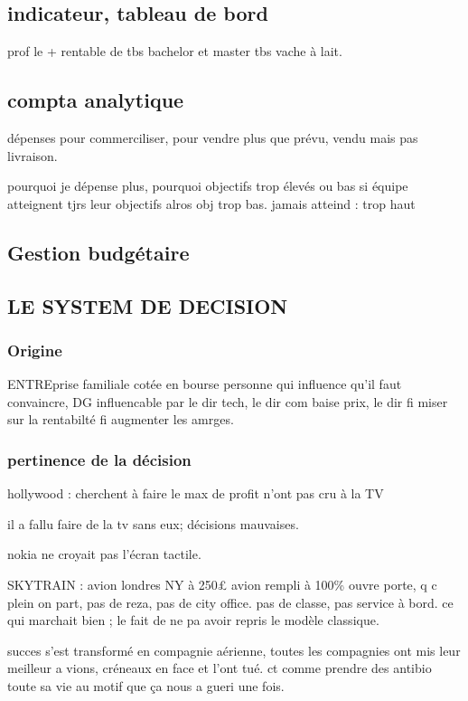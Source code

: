 \documentclass[a4paper,12pt]{article}
\begin{document}
\subsection{indicateur, tableau de bord}
prof le + rentable de tbs bachelor et master tbs vache à lait.

\subsection{compta analytique}
dépenses pour commerciliser, pour vendre plus que prévu, vendu mais pas livraison.

pourquoi je dépense plus, pourquoi objectifs trop élevés ou bas
si équipe atteignent tjrs leur objectifs alros obj trop bas.
jamais atteind : trop haut
\subsection{Gestion budgétaire}

 \subsection{LE SYSTEM DE DECISION}
 
 
 \subsubsection{Origine}
 ENTREprise familiale cotée en bourse
 personne qui influence qu'il faut convaincre, DG influencable par le dir tech, le dir com baise prix,
 le dir fi miser sur la rentabilté fi augmenter les amrges.
 
 \subsubsection{pertinence de la décision} 
 hollywood : cherchent à faire le max de profit
 n'ont pas cru à la TV
 
 il a fallu faire de la tv sans eux; décisions mauvaises.
 
 nokia ne croyait pas l'écran tactile.
 
 SKYTRAIN : avion londres NY à 250£ 
 avion rempli à 100\% ouvre porte, q c plein on part, pas de reza, pas de city office.
 pas de classe, pas service à bord.
 ce qui marchait bien ; le fait de ne pa avoir repris le modèle classique.
 
 succes s'est transformé en compagnie aérienne, toutes les compagnies ont mis leur meilleur a	vions, créneaux en face
 et l'ont tué.  
 ct comme prendre des antibio toute sa vie au motif que ça nous a gueri une fois.
 
\end{document}
